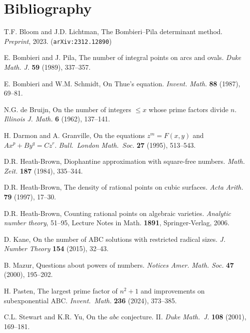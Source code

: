 \chapter{Bibliography}
\begin{thebibliography}{99}

T.F. Bloom and J.D. Lichtman, The Bombieri--Pila determinant method.
{\em Preprint}, 2023.
({\tt arXiv:2312.12890})

E. Bombieri and J. Pila, The number of integral points on
arcs and ovals. {\em Duke Math. J.} {\bf 59} (1989), 337--357.

E. Bombieri and W.M. Schmidt,
On Thue's equation.
{\em Invent. Math.} {\bf 88} (1987), 69--81.




N.G. de Bruijn,
On the number of integers {$\leq x$} whose prime factors
              divide {$n$}.
              {\em Illinois J. Math.} {\bf 6} (1962), {137--141}.


H. Darmon and A. Granville,
On the equations $z^m=F(x,y)$ and $Ax^p+By^q=Cz^r$. {\em Bull.\ London Math.\ Soc.} {\bf 27}
(1995), 513--543.

 D.R. Heath-Brown,
Diophantine approximation with square-free numbers.
{\em Math. Zeit.} {\bf 187} (1984), {335--344}.

 D.R. Heath-Brown, The density of rational points on
cubic surfaces. {\em Acta Arith.} {\bf 79} (1997), 17--30.


 D.R. Heath-Brown, Counting rational points on algebraic
  varieties.  {\em Analytic number theory},  51--95, Lecture Notes in
  Math. {\bf 1891}, Springer-Verlag, 2006.

D. Kane,
On the number of ABC solutions with restricted radical sizes.
{\em J. Number Theory} {\bf 154} (2015), 32--43.

B. Mazur,
Questions about powers of numbers.
{\em Notices Amer. Math. Soc.} {\bf 47} (2000), 195--202.

H. Pasten,
  The largest prime factor of  $n^2+1$  and improvements on subexponential  ABC.
{\em Invent.\ Math.} {\bf 236} (2024), 373--385.

C.L. Stewart and K.R. Yu,
On the $abc$ conjecture. II.
{\it Duke Math.\ J.} {\bf 108} (2001), 169--181.

\end{thebibliography}
